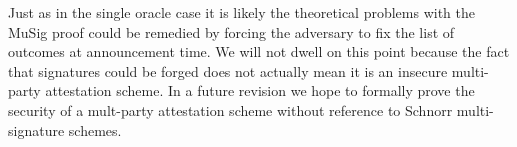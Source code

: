 \documentclass[runningheads]{llncs}
\newcommand{\F}{\mathcal{F}}
\begin{document}
Just as in the single oracle case it is likely the theoretical problems with the MuSig proof could be remedied by forcing the adversary to fix the list of outcomes at announcement time.
We will not dwell on this point because the fact that signatures could be forged does not actually mean it is an insecure multi-party attestation scheme.
In a future revision we hope to formally prove the security of a mult-party attestation scheme without reference to Schnorr multi-signature schemes.

\end{document}
